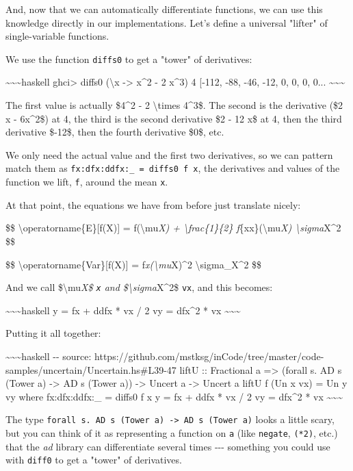 \documentclass[]{article}
\begin{document}
And, now that we can automatically differentiate functions, we can use this
knowledge directly in our implementations. Let's define a universal "lifter" of
single-variable functions.

We use the function \texttt{diffs0} to get a "tower" of derivatives:

\textasciitilde{}\textasciitilde{}\textasciitilde{}haskell ghci\textgreater{}
diffs0 (\textbackslash{}x -\textgreater{} x\^{}2 - 2 x\^{}3) 4 {[}-112, -88,
-46, -12, 0, 0, 0, 0... \textasciitilde{}\textasciitilde{}\textasciitilde{}

The first value is actually \$4\^{}2 - 2 \textbackslash{}times 4\^{}3\$. The
second is the derivative (\$2 x - 6x\^{}2\$) at 4, the third is the second
derivative \$2 - 12 x\$ at 4, then the third derivative \$-12\$, then the fourth
derivative \$0\$, etc.

We only need the actual value and the first two derivatives, so we can pattern
match them as \texttt{fx:dfx:ddfx:\_\ =\ diffs0\ f\ x}, the derivatives and
values of the function we lift, \texttt{f}, around the mean \texttt{x}.

At that point, the equations we have from before just translate nicely:

\$\$ \textbackslash{}operatorname\{E\}{[}f(X){]} = f(\textbackslash{}mu\emph{X)
+ \textbackslash{}frac\{1\}\{2\} f}\{xx\}(\textbackslash{}mu\emph{X)
\textbackslash{}sigma}X\^{}2 \$\$

\$\$ \textbackslash{}operatorname\{Var\}{[}f(X){]} =
f\emph{x(\textbackslash{}mu}X)\^{}2 \textbackslash{}sigma\_X\^{}2 \$\$

And we call \$\textbackslash{}mu\emph{X\$ \texttt{x} and
\$\textbackslash{}sigma}X\^{}2\$ \texttt{vx}, and this becomes:

\textasciitilde{}\textasciitilde{}\textasciitilde{}haskell y = fx + ddfx * vx /
2 vy = dfx\^{}2 * vx \textasciitilde{}\textasciitilde{}\textasciitilde{}

Putting it all together:

\textasciitilde{}\textasciitilde{}\textasciitilde{}haskell -\/- source:
https://github.com/mstksg/inCode/tree/master/code-samples/uncertain/Uncertain.hs\#L39-47
liftU :: Fractional a =\textgreater{} (forall s. AD s (Tower a) -\textgreater{}
AD s (Tower a)) -\textgreater{} Uncert a -\textgreater{} Uncert a liftU f (Un x
vx) = Un y vy where fx:dfx:ddfx:\_ = diffs0 f x y = fx + ddfx * vx / 2 vy =
dfx\^{}2 * vx \textasciitilde{}\textasciitilde{}\textasciitilde{}

The type
\texttt{forall\ s.\ AD\ s\ (Tower\ a)\ -\textgreater{}\ AD\ s\ (Tower\ a)} looks
a little scary, but you can think of it as representing a function on \texttt{a}
(like \texttt{negate}, \texttt{(*2)}, etc.) that the \emph{ad} library can
differentiate several times -\/-\/- something you could use with \texttt{diff0}
to get a "tower" of derivatives.
\end{document}
